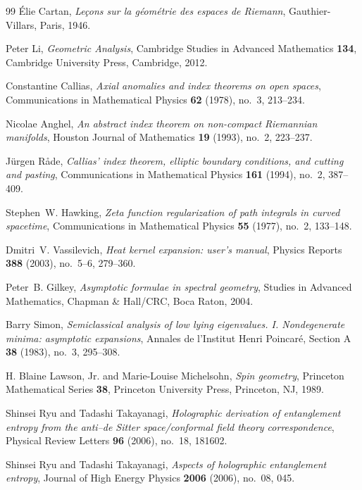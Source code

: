 \begin{thebibliography}{99}
\'Elie Cartan, \emph{Le\c{c}ons sur la g\'eom\'etrie des espaces de Riemann}, Gauthier-Villars, Paris, 1946.

Peter Li, \emph{Geometric Analysis}, Cambridge Studies in Advanced Mathematics \textbf{134}, Cambridge University Press, Cambridge, 2012.

Constantine Callias, \emph{Axial anomalies and index theorems on open spaces}, Communications in Mathematical Physics \textbf{62} (1978), no.~3, 213--234.

Nicolae Anghel, \emph{An abstract index theorem on non-compact Riemannian manifolds}, Houston Journal of Mathematics \textbf{19} (1993), no.~2, 223--237.

J\"urgen R\r{a}de, \emph{Callias' index theorem, elliptic boundary conditions, and cutting and pasting}, Communications in Mathematical Physics \textbf{161} (1994), no.~2, 387--409.

Stephen~W. Hawking, \emph{Zeta function regularization of path integrals in curved spacetime}, Communications in Mathematical Physics \textbf{55} (1977), no.~2, 133--148.

Dmitri~V. Vassilevich, \emph{Heat kernel expansion: user's manual}, Physics Reports \textbf{388} (2003), no.~5--6, 279--360.

Peter~B. Gilkey, \emph{Asymptotic formulae in spectral geometry}, Studies in Advanced Mathematics, Chapman \& Hall/CRC, Boca Raton, 2004.

Barry Simon, \emph{Semiclassical analysis of low lying eigenvalues. I. Nondegenerate minima: asymptotic expansions}, Annales de l'Institut Henri Poincar\'e, Section A \textbf{38} (1983), no.~3, 295--308.

H. Blaine Lawson, Jr. and Marie-Louise Michelsohn, \emph{Spin geometry}, Princeton Mathematical Series \textbf{38}, Princeton University Press, Princeton, NJ, 1989.

Shinsei Ryu and Tadashi Takayanagi, \emph{Holographic derivation of entanglement entropy from the anti--de Sitter space/conformal field theory correspondence}, Physical Review Letters \textbf{96} (2006), no.~18, 181602.

Shinsei Ryu and Tadashi Takayanagi, \emph{Aspects of holographic entanglement entropy}, Journal of High Energy Physics \textbf{2006} (2006), no.~08, 045.


\end{thebibliography}
